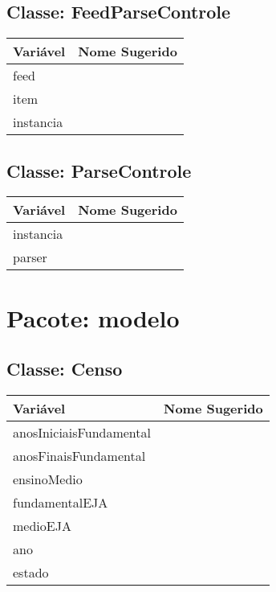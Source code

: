 \documentclass[12pt]{article}
\begin{document}
	\subsection{Classe: FeedParseControle}
		\begin{table}[H]
			\begin{center}
				\begin{tabular}{l | l}
					\toprule
						Variável & Nome Sugerido\\
					\midrule
						feed & \\
						item & \\
						instancia & \\
					\bottomrule
				\end{tabular}
			\end{center}
		\end{table}

	\subsection{Classe: ParseControle}
		\begin{table}[H]
			\begin{center}
				\begin{tabular}{l | l}
					\toprule
						Variável & Nome Sugerido\\
					\midrule
						instancia & \\
						parser & \\
					\bottomrule
				\end{tabular}
			\end{center}
		\end{table}

\newpage
\section{Pacote: modelo}
	\subsection{Classe: Censo}
		\begin{table}[H]
			\begin{center}
				\begin{tabular}{l | l}
					\toprule
						Variável & Nome Sugerido\\
					\midrule
						anosIniciaisFundamental & \\
						anosFinaisFundamental & \\
						ensinoMedio & \\
						fundamentalEJA & \\
						medioEJA & \\
						ano & \\
						estado & \\
					\bottomrule
				\end{tabular}
			\end{center}
		\end{table}
\end{document}

